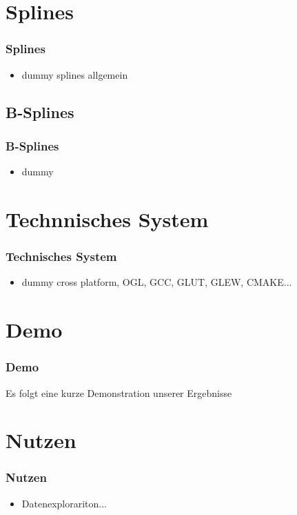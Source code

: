 \documentclass[11pt]{beamer}
\begin{document}
\section{Splines}
\begin{frame}
\frametitle{Splines}
\begin{itemize}
\item dummy splines allgemein
\end{itemize}

\end{frame}



\subsection{B-Splines}
\begin{frame}
\frametitle{B-Splines}

\begin{itemize}
\item dummy
\end{itemize}

\end{frame}



\section{Technnisches System}
\begin{frame}
\frametitle{Technisches System}
\begin{itemize}
\item dummy cross platform, OGL, GCC, GLUT, GLEW, CMAKE...
\end{itemize}

\end{frame}



\section{Demo}
\begin{frame}
\frametitle{Demo}
Es folgt eine kurze Demonstration unserer Ergebnisse

\end{frame}


\section{Nutzen}
\begin{frame}
\frametitle{Nutzen}
\begin{itemize}
\item Datenexplorariton...
\end{itemize}

\end{frame}
\end{document}
